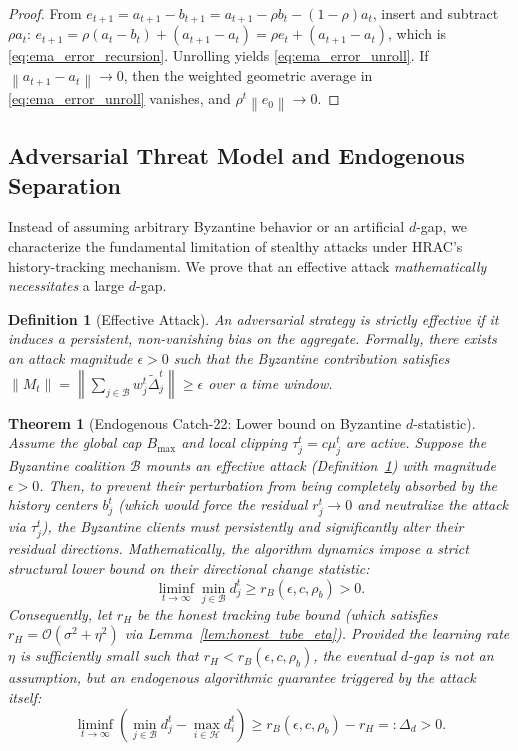 \documentclass[11pt,a4paper]{article}
\newtheorem{theorem}{Theorem}
\newtheorem{definition}{Definition}
\theoremstyle{remark}
\newcommand{\HH}{\mathcal{H}}
\newcommand{\BB}{\mathcal{B}}
\newcommand{\norm}[1]{\left\lVert #1 \right\rVert}
\begin{document}
\begin{proof}
From
\(
e_{t+1}
=
a_{t+1}-b_{t+1}
=
a_{t+1}-\rho b_t-(1-\rho)a_t
\),
insert and subtract \(\rho a_t\):
\(
e_{t+1}
=
\rho(a_t-b_t)+(a_{t+1}-a_t)
=
\rho e_t+(a_{t+1}-a_t)
\),
which is \eqref{eq:ema_error_recursion}. Unrolling yields
\eqref{eq:ema_error_unroll}. If \(\norm{a_{t+1}-a_t}\to 0\), then the weighted
geometric average in \eqref{eq:ema_error_unroll} vanishes, and \(\rho^t\norm{e_0}\to 0\).
\end{proof}

\subsection{Adversarial Threat Model and Endogenous Separation}

Instead of assuming arbitrary Byzantine behavior or an artificial $d$-gap, we characterize the fundamental limitation of stealthy attacks under HRAC's history-tracking mechanism. We prove that an effective attack \emph{mathematically necessitates} a large $d$-gap.

\begin{definition}[Effective Attack]
\label{def:effective_attack}
An adversarial strategy is strictly \emph{effective} if it induces a persistent, non-vanishing bias on the aggregate. Formally, there exists an attack magnitude $\epsilon > 0$ such that the Byzantine contribution satisfies $\norm{M_t} = \norm{\sum_{j\in\BB} w_j^t \tilde{\Delta}_j^t} \ge \epsilon$ over a time window.
\end{definition}

\begin{theorem}[Endogenous Catch-22: Lower bound on Byzantine $d$-statistic]
\label{thm:endogenous_catch22}
Assume the global cap $B_{\max}$ and local clipping $\tau_j^t = c\mu_j^t$ are active. Suppose the Byzantine coalition $\BB$ mounts an effective attack (Definition~\ref{def:effective_attack}) with magnitude $\epsilon > 0$. 
Then, to prevent their perturbation from being completely absorbed by the history centers $b_j^t$ (which would force the residual $r_j^t \to 0$ and neutralize the attack via $\tau_j^t$), the Byzantine clients must persistently and significantly alter their residual directions.
Mathematically, the algorithm dynamics impose a strict structural lower bound on their directional change statistic:
\begin{equation}
    \liminf_{t \to \infty} \min_{j\in\BB} d_j^t \ge r_B(\epsilon, c, \rho_b) > 0.
    \label{eq:rb_lower_bound}
\end{equation}
Consequently, let $r_H$ be the honest tracking tube bound (which satisfies $r_H = \mathcal{O}(\sigma^2 + \eta^2)$ via Lemma~\ref{lem:honest_tube_eta}). Provided the learning rate $\eta$ is sufficiently small such that $r_H < r_B(\epsilon, c, \rho_b)$, the eventual $d$-gap is not an assumption, but an \emph{endogenous algorithmic guarantee} triggered by the attack itself:
\begin{equation}
    \liminf_{t \to \infty} \left( \min_{j\in\BB} d_j^t - \max_{i\in\HH} d_i^t \right) \ge r_B(\epsilon, c, \rho_b) - r_H =: \Delta_d > 0.
    \label{eq:endogenous_d_gap}
\end{equation}
\end{theorem}
\end{document}
